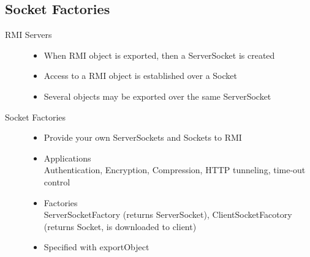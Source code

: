 \documentclass[10pt]{article}
\begin{document}
\subsection{Socket Factories}
\begin{description}
	\item[RMI Servers] \hfill
		\begin{itemize}
			\item When RMI object is exported, then a ServerSocket is created
			\item Access to a RMI object is established over a Socket
			\item Several objects may be exported over the same ServerSocket
		\end{itemize}
	\item[Socket Factories] \hfill
		\begin{itemize}
			\item Provide your own ServerSockets and Sockets to RMI
			\item Applications \\
				Authentication, Encryption, Compression, HTTP tunneling, time-out control
			\item Factories	\\
				ServerSocketFactory (returns ServerSocket), ClientSocketFacotory (returns Socket, is downloaded to client)
			\item Specified with exportObject
		\end{itemize}
\end{description}
\end{document}
